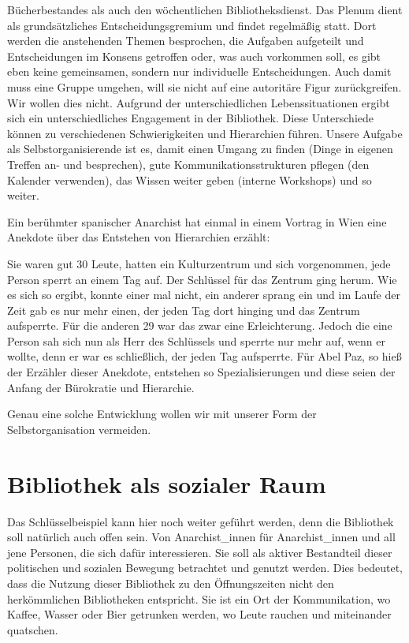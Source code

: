 \documentclass[a4paper,
fontsize=11pt,
oneside,
numbers=noperiodatend,
parskip=half-,
bibliography=totoc,
final
]{scrartcl}
\begin{document}
Bücherbestandes als auch den wöchentlichen Bibliotheksdienst. Das Plenum
dient als grundsätzliches Entscheidungsgremium und findet regelmäßig
statt. Dort werden die anstehenden Themen besprochen, die Aufgaben
aufgeteilt und Entscheidungen im Konsens getroffen oder, was auch
vorkommen soll, es gibt eben keine gemeinsamen, sondern nur individuelle
Entscheidungen. Auch damit muss eine Gruppe umgehen, will sie nicht auf
eine autoritäre Figur zurückgreifen. Wir wollen dies nicht. Aufgrund der
unterschiedlichen Lebenssituationen ergibt sich ein unterschiedliches
Engagement in der Bibliothek. Diese Unterschiede können zu verschiedenen
Schwierigkeiten und Hierarchien führen. Unsere Aufgabe als
Selbstorganisierende ist es, damit einen Umgang zu finden (Dinge in
eigenen Treffen an- und besprechen), gute Kommunikationsstrukturen
pflegen (den Kalender verwenden), das Wissen weiter geben (interne
Workshops) und so weiter.

Ein berühmter spanischer Anarchist hat einmal in einem Vortrag in Wien
eine Anekdote über das Entstehen von Hierarchien erzählt:

Sie waren gut 30 Leute, hatten ein Kulturzentrum und sich vorgenommen,
jede Person sperrt an einem Tag auf. Der Schlüssel für das Zentrum ging
herum. Wie es sich so ergibt, konnte einer mal nicht, ein anderer sprang
ein und im Laufe der Zeit gab es nur mehr einen, der jeden Tag dort
hinging und das Zentrum aufsperrte. Für die anderen 29 war das zwar eine
Erleichterung. Jedoch die eine Person sah sich nun als Herr des
Schlüssels und sperrte nur mehr auf, wenn er wollte, denn er war es
schließlich, der jeden Tag aufsperrte. Für Abel Paz, so hieß der
Erzähler dieser Anekdote, entstehen so Spezialisierungen und diese seien
der Anfang der Bürokratie und Hierarchie.

Genau eine solche Entwicklung wollen wir mit unserer Form der
Selbstorganisation vermeiden.

\section*{Bibliothek als sozialer
Raum}\label{bibliothek-als-sozialer-raum}

Das Schlüsselbeispiel kann hier noch weiter geführt werden, denn die
Bibliothek soll natürlich auch offen sein. Von Anarchist\_innen für
Anarchist\_innen und all jene Personen, die sich dafür interessieren.
Sie soll als aktiver Bestandteil dieser politischen und sozialen
Bewegung betrachtet und genutzt werden. Dies bedeutet, dass die Nutzung
dieser Bibliothek zu den Öffnungszeiten nicht den herkömmlichen
Bibliotheken entspricht. Sie ist ein Ort der Kommunikation, wo Kaffee,
Wasser oder Bier getrunken werden, wo Leute rauchen und miteinander
quatschen.
\end{document}
